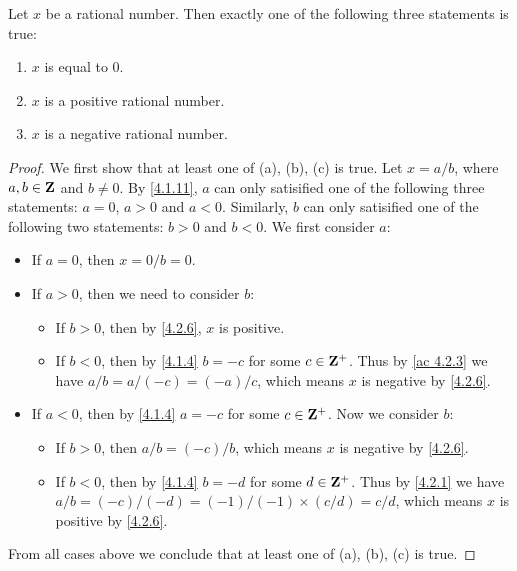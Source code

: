 \begin{lemma}\label{4.2.7}
  Let \(x\) be a rational number.
  Then exactly one of the following three statements is true:
  \begin{enumerate}
    \item \(x\) is equal to \(0\).
    \item \(x\) is a positive rational number.
    \item \(x\) is a negative rational number.
  \end{enumerate}
\end{lemma}

\begin{proof}
  We first show that at least one of (a), (b), (c) is true.
  Let \(x = a / b\), where \(a, b \in \mathbf{Z}\) and \(b \neq 0\).
  By \cref{4.1.11}, \(a\) can only satisified one of the following three statements:
  \(a = 0\), \(a > 0\) and \(a < 0\).
  Similarly, \(b\) can only satisified one of the following two statements:
  \(b > 0\) and \(b < 0\).
  We first consider \(a\):
  \begin{itemize}
    \item If \(a = 0\), then \(x = 0 / b = 0\).
    \item If \(a > 0\), then we need to consider \(b\):
          \begin{itemize}
            \item If \(b > 0\), then by \cref{4.2.6}, \(x\) is positive.
            \item If \(b < 0\), then by \cref{4.1.4} \(b = -c\) for some \(c \in \mathbf{Z}^+\).
                  Thus by \cref{ac 4.2.3} we have \(a / b = a / (-c) = (-a) / c\), which means \(x\) is negative by \cref{4.2.6}.
          \end{itemize}
    \item If \(a < 0\), then by \cref{4.1.4} \(a = -c\) for some \(c \in \mathbf{Z}^+\).
          Now we consider \(b\):
          \begin{itemize}
            \item If \(b > 0\), then \(a / b = (-c) / b\), which means \(x\) is negative by \cref{4.2.6}.
            \item If \(b < 0\), then by \cref{4.1.4} \(b = -d\) for some \(d \in \mathbf{Z}^+\).
                  Thus by \cref{4.2.1} we have \(a / b = (-c) / (-d) = (-1) / (-1) \times (c / d) = c / d\), which means \(x\) is positive by \cref{4.2.6}.
          \end{itemize}
  \end{itemize}
  From all cases above we conclude that at least one of (a), (b), (c) is true.


\end{proof}
